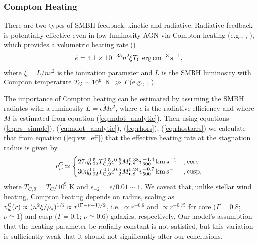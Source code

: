 \documentclass[usenatbib,fleqn]{mn2e}
\newcommand{\densSlope}{\nu}
\begin{document}
\subsubsection{Compton Heating}

There are two types of SMBH feedback: kinetic and radiative.  Radiative feedback is potentially effective even in low luminosity AGN via Compton heating (e.g., \citealt{Sazonov+04}, \citealt{Ciotti+10}), which provides a volumetric heating rate (\citealt{Gan+14})
\begin{align}
\dot{e} = 4.1\times 10^{-35}n^{2}\xi T_{\rm C}\,{\rm erg\,cm^{-3}\,s^{-1}},
\end{align}
where $\xi = L/n r^{2}$ is the ionization parameter and $L$ is the SMBH luminosity with Compton temperature $T_{\rm C} \sim 10^{9}$ K $\gg T$ (e.g., \citealt{Ho99}, \citealt{Eracleous+10}).  

The importance of Compton heating can be estimated by assuming the SMBH
radiates with a luminosity $L = \epsilon \dot{M}c^{2}$, where
$\epsilon$ is the radiative efficiency and where $\dot{M}$ is
estimated from equation (\ref{eq:mdot_analytic}).  Then using
equations (\ref{eq:rs_simple}), (\ref{eq:mdot_analytic}),
(\ref{eq:rhors}), (\ref{eq:rhostarrs}) we calculate that from equation
(\ref{eq:vw_eff}) that the effective heating rate at the stagnation radius is given by
\begin{align} v_{w}^{\rm C} \simeq
  \begin{cases} 27 \eta_{0.02}^{0.5}T_{\rm
C,9}^{0.5}\epsilon_{-2}^{0.5} M_{\bullet,8}^{0.38}v_{500}^{-1.4}\,{\rm
km\,s^{-1}} &, \text{core}\\ 30 \eta_{0.02}^{0.5}T_{\rm
C,9}^{0.5}\epsilon_{-2}^{0.5} M_{\bullet,8}^{0.24}v_{500}^{-0.7}\,{\rm
km\,s^{-1}} &, \text{cusp},
  \end{cases}
  \label{eq:vC}
\end{align} where $T_{C,9} = T_{C}/10^{9}$ K and $\epsilon_{-2} =
\epsilon/0.01 \sim 1$.  We caveat that, unlike
stellar wind heating, Compton heating depends on radius, scaling as
$v_{w}^{\rm C}(r) \propto (n^{2}\xi/\rho_{\star})^{1/2} \propto
r^{(\Gamma-\densSlope-1)/2}$, i.e. $\propto r^{-0.6}$ and $\propto r^{-0.75}$
for core ($\Gamma = 0.8$; $\densSlope \simeq 1$) and cusp ($\Gamma = 0.1$;
$\densSlope \simeq 0.6$) galaxies, respectively.  Our model's assumption that the heating
parameter be radially constant is not satisfied, but this variation is sufficiently weak that it should not significantly alter
our conclusions.
\end{document}

